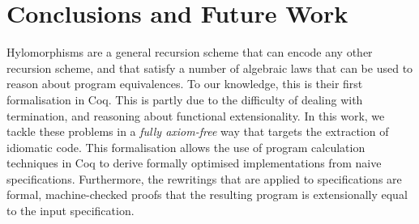 \documentclass[a4paper,anonymous, UKenglish,cleveref, autoref, thm-restate]{lipics-v2021}
\newcommand{\haskell}[1]{\texttt{#1}}
\begin{document}



\section{Conclusions and Future Work}

Hylomorphisms are a general recursion scheme that can encode any other
recursion scheme, and that satisfy a number of algebraic laws that can be used
to reason about program equivalences. To our knowledge, this is their first formalisation
in Coq. This is partly due to the
difficulty of dealing with termination, and reasoning about functional
extensionality. In this work, we tackle these problems in a \emph{fully
axiom-free} way that targets the extraction of idiomatic code.  This
formalisation allows the use of program calculation techniques in Coq to derive
formally optimised implementations from naive specifications. Furthermore, the
rewritings that are applied to specifications are formal, machine-checked
proofs that the resulting program is extensionally equal to the input
specification. 
\end{document}
